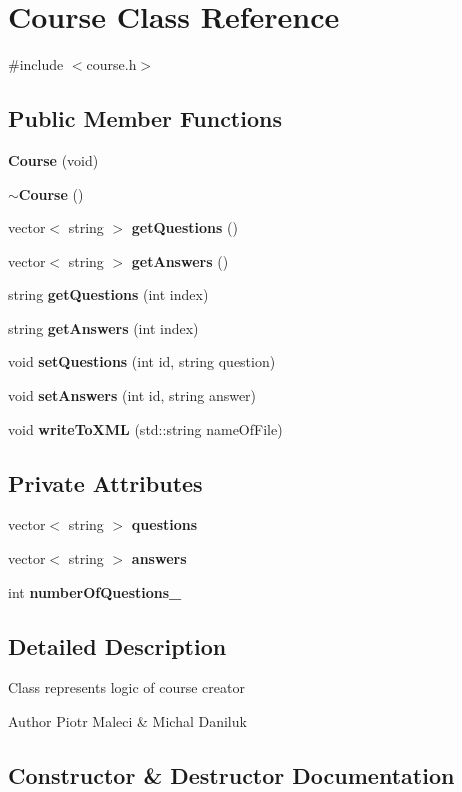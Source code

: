 \section{Course Class Reference}
\label{class_course}


{\ttfamily \#include $<$course.\-h$>$}

\subsection*{Public Member Functions}
\begin{DoxyCompactItemize}
\item 
{\bf Course} (void)
\item 
{\bf $\sim$\-Course} ()
\item 
vector$<$ string $>$ {\bf get\-Questions} ()
\item 
vector$<$ string $>$ {\bf get\-Answers} ()
\item 
string {\bf get\-Questions} (int index)
\item 
string {\bf get\-Answers} (int index)
\item 
void {\bf set\-Questions} (int id, string question)
\item 
void {\bf set\-Answers} (int id, string answer)
\item 
void {\bf write\-To\-X\-M\-L} (std\-::string name\-Of\-File)
\end{DoxyCompactItemize}
\subsection*{Private Attributes}
\begin{DoxyCompactItemize}
\item 
vector$<$ string $>$ {\bf questions}
\item 
vector$<$ string $>$ {\bf answers}
\item 
int {\bf number\-Of\-Questions\-\_\-}
\end{DoxyCompactItemize}


\subsection{Detailed Description}
Class represents logic of course creator \begin{DoxyAuthor}{Author}
Piotr Maleci \& Michal Daniluk 
\end{DoxyAuthor}


\subsection{Constructor \& Destructor Documentation}
